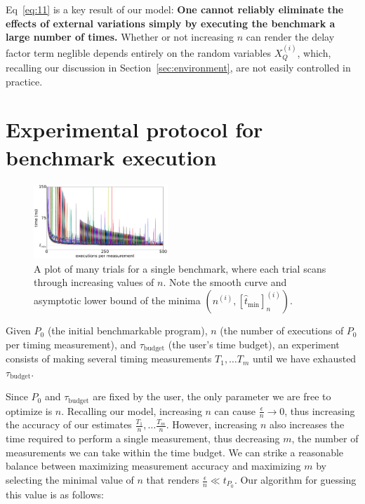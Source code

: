 \documentclass[conference]{IEEEtran}
\begin{document}
Eq~\ref{eq:11} is a key result of our model: \textbf{One cannot reliably eliminate the
effects of external variations simply by executing the benchmark a large number of times.}
Whether or not increasing $n$ can render the delay factor term neglible depends entirely on
the random variables $X_Q^{(i)}$, which, recalling our discussion in
Section~\ref{sec:environment}, are not easily controlled in practice.

\label{sec:protocol}
\section{Experimental protocol for benchmark execution}

\begin{figure}
\centering
\includegraphics[width=0.45\textwidth]{figures/fig2/linear_scan_branchsum}
\caption{A plot of many trials for a single benchmark, where each trial scans through
increasing values of $n$. Note the smooth curve and asymptotic lower bound of the minima
$(n^{(i)}, [\hat{t}_{\textrm{min}}]^{(i)}_n)$.}
\label{fig:scaling}
\end{figure}

Given $P_0$ (the initial benchmarkable program), $n$ (the number of executions of $P_0$ per
timing measurement), and $\tau_{\textrm{budget}}$ (the user's time budget), an experiment
consists of making several timing measurements $T_1, \dots T_m$ until we have exhausted
$\tau_{\textrm{budget}}$.

Since $P_0$ and $\tau_{\textrm{budget}}$ are fixed by the user, the only parameter we are
free to optimize is $n$. Recalling our model, increasing $n$ can cause $\frac{\epsilon}{n}
\to 0$, thus increasing the accuracy of our estimates $\frac{T_1}{n}, \dots \frac{T_m}{n}$.
However, increasing $n$ also increases the time required to perform a single measurement,
thus decreasing $m$, the number of measurements we can take within the time budget. We can
strike a reasonable balance between maximizing measurement accuracy and maximizing $m$ by
selecting the minimal value of $n$ that renders $\frac{\epsilon}{n} \ll t_{P_0}$. Our
algorithm for guessing this value is as follows:
\end{document}
